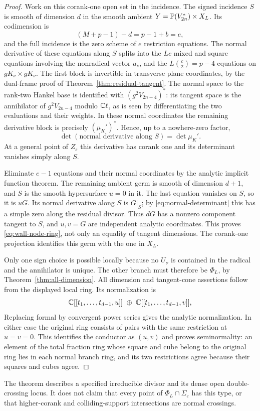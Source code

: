 \begin{proof}
Work on this corank-one open set in the incidence. The signed
incidence $S$ is smooth of dimension $d$ in the smooth ambient
$Y=\mathbb P(V_{2n}^*)\times X_L$. Its codimension is
\[
 (M+p-1)-d=p-1+b=e,
\]
and the full incidence is the zero scheme of $e$ restriction equations.
The normal derivative of these equations along $S$ splits into the
$Lc$ mixed and square equations involving the nonradical vector
$a_\nu$, and the $L\binom c2=p-4$ equations on
$gK_\nu\times gK_\nu$. The first block is invertible in transverse
plane coordinates, by the dual-frame proof of
Theorem~\ref{thm:residual-tangent}. The normal space to the rank-two
Hankel base is identified with $(g^2V_{2n-4})^*$: its tangent space
is the annihilator of $g^2V_{2n-4}$ modulo $\mathbb C\ell$, as is seen by
differentiating the two evaluations and their weights. In these
normal coordinates the remaining derivative block is precisely
$(\mu_K')^*$. Hence, up to a nowhere-zero factor,
\begin{equation}\label{eq:normal-determinant}
 \det(\text{normal derivative along }S)=\det\mu_K'.
\end{equation}
At a general point of $Z_\varepsilon$ this derivative has corank one
and its determinant vanishes simply along $S$.

Eliminate $e-1$ equations and their normal coordinates by the analytic
implicit function theorem. The remaining ambient germ is smooth of
dimension $d+1$, and $S$ is the smooth hypersurface $u=0$ in it.
The last equation vanishes on $S$, so it is $uG$. Its normal derivative
along $S$ is $G|_S$; by \eqref{eq:normal-determinant} this has a simple
zero along the residual divisor. Thus $dG$ has a nonzero component
tangent to $S$, and $u,v=G$ are independent analytic coordinates.
This proves \eqref{eq:wall-node-ring}, not only an equality of tangent
dimensions. The corank-one projection identifies this germ with the
one in $X_L$.

Only one sign choice is possible locally because no $U_\nu$ is
contained in the radical and the annihilator is unique. The other
branch must therefore be $\Phi_L$, by
Theorem~\ref{thm:all-dimension}. All dimension and tangent-cone
assertions follow from the displayed local ring. Its normalization is
\[
 \mathbb C[[t_1,\ldots,t_{d-1},u]]\ \oplus\
 \mathbb C[[t_1,\ldots,t_{d-1},v]],
\]
Replacing formal by convergent power series gives the analytic
normalization. In either case the original ring consists of pairs with
the same restriction at
$u=v=0$. This identifies the conductor as $(u,v)$ and proves
seminormality: an element of the total fraction ring whose square and
cube belong to the original ring lies in each normal branch ring, and
its two restrictions agree because their squares and cubes agree.
\end{proof}
The theorem describes a specified irreducible divisor and its dense
open double-crossing locus. It does not claim that every point of
$\Phi_L\cap\Sigma_\varepsilon$ has this type, or that higher-corank
and colliding-support intersections are normal crossings.

